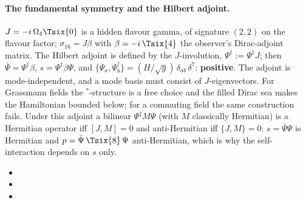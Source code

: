 \paragraph{The fundamental symmetry and the Hilbert adjoint.} $J=-i\,\Omega_4\Tsix{0}$ is a hidden
flavour gamma, of signature $(2,2)$ on the flavour factor; $\sigma_{16}=J\beta$ with
$\beta=-i\,\Tsix{4}$ the observer's Dirac-adjoint matrix. The Hilbert adjoint is defined by the
$J$-involution, $\Psi^{\dagger}:=\Psi^{\ddagger}J$; then $\bar\Psi=\Psi^{\dagger}\beta$,
$s=\Psi^{\dagger}\beta\Psi$, and $\{\Psi_a,\Psi^{\dagger}_b\}=(H/\sqrt g)\,\delta_{ab}\,\delta^7$:
\textbf{positive}. The adjoint is mode-independent, and a mode basis must consist of $J$-eigenvectors.
For Grassmann fields the ${}^*$-structure is a free choice and the filled Dirac sea makes the
Hamiltonian bounded below; for a commuting field the same construction fails. Under this adjoint a
bilinear $\Psi^{\ddagger}M\Psi$ (with $M$ classically Hermitian) is a Hermitian operator iff $[J,M]=0$
and anti-Hermitian iff $\{J,M\}=0$: $s=\bar\Psi\Psi$ is Hermitian and $p=\bar\Psi\,\Tsix{8}\,\Psi$
anti-Hermitian, which is why the self-interaction depends on $s$ only. 
\begin{itemize}
  \item {}
  \item {}
  \item {}
\end{itemize}

